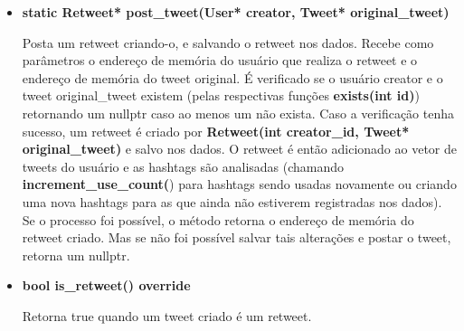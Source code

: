 \documentclass[a4paper]{article}
\begin{document}
\begin{itemize}
    \item \textbf{static Retweet* post\_tweet(User* creator, Tweet* original\_tweet)}

    Posta um retweet criando-o, e salvando o retweet nos dados. Recebe como parâmetros o endereço de memória do usuário que realiza o retweet e o endereço de memória do tweet original. É verificado se o usuário creator e o tweet original\_tweet existem (pelas respectivas funções \textbf{exists(int id)}) retornando um nullptr caso ao menos um não exista. Caso a verificação tenha sucesso, um retweet é criado por \textbf{Retweet(int creator\_id, Tweet* original\_tweet)} e salvo nos dados. O retweet é então adicionado ao vetor de tweets do usuário e as hashtags são analisadas (chamando\textbf{ increment\_use\_count(}) para hashtags sendo usadas novamente ou criando uma nova hashtags para as que ainda não estiverem registradas nos dados). Se o processo foi possível, o método retorna o endereço de memória do retweet criado. Mas se não foi possível salvar tais alterações e postar o tweet, retorna um nullptr.

    \item \textbf{bool is\_retweet() override}

    Retorna true quando um tweet criado é um retweet.


\end{itemize}
\end{document}
